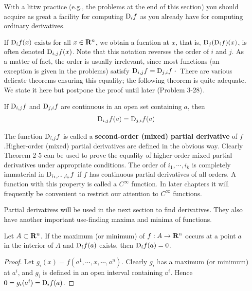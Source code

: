 With a littw practice (e.g., the problems at the end of this
section) you should acquire as great a facility for computing
$\mathrm{D}_if$ as you already have for computing ordinary derivatives.

If $\mathrm{D}_if(x)$ exists for all $x\in \mathbf{R}^n$, we obtain a fucntion at $x$, that 
is, $\mathrm{D}_j(\mathrm{D}_if)(x)$, is often denoted $\mathrm{D}_{i,j}f(x)$. Note that this notation 
reverses the order of $i$ and $j$. As a matter of fact, the
order is usually irrelevant, since most functions (an exception is
given in the problems) satisfy $\mathrm{D}_{i,j}f = \mathrm{D}_{j,i}f$· There are various
delicate theorems ensuring this equality; the following theorem
is quite adequate. We state it here but postpone the proof until later (Problem 3-28).

\begin{theorem}
    If $\mathrm{D}_{i,j}f$ and $\mathrm{D}_{j,i}f$ are continuous in an open set containing $a$, then 
    \begin{align}
        \mathrm{D}_{i,j}f(a) = \mathrm{D}_{j,i}f(a)
    \end{align}
\end{theorem}

The function $\mathrm{D}_{i,j}f$ is called a \textbf{second-order (mixed) partial derivative}
of $f$.Higher-order (mixed) partial derivatives are defined in the obvious way.
Clearly Theorem 2-5 can be used to prove the equality of higher-order mixed
partial derivatives under appropriate conditions.
The order of $i_1, \cdots ,i_k$ is completely immaterial in $\mathrm{D}_{i_1,\cdots,i_k}f$
if $f$ has continuous partial derivatives of all orders. A function
with this property is called a $C^\infty$ function. In later chapters
it will frequently be convenient to restrict our attention to $C^\infty$
functions.

Partial derivatives will be used in the next section to find
derivatives. They also have another important use-finding
maxima and minima of functions.

\begin{theorem}
    Let $A\subset \mathbf{R}^n$. If the maximum (or minimum) of $f:A\to \mathbf{R}^n$ occurs at a 
    point $a$ in the interior of $A$ and $\mathrm{D}_if(a)$ exists, then $\mathrm{D}_if(a) = 0$.
\end{theorem}

\begin{proof}
    Let $g_i(x) = f(a^1, \cdots, x, \cdots, a^n)$. Clearly $g_i$ has a maximum (or minimum)
    at $a^i$, and $g_i$ is defined in an open interval containing 
    $a^i$. Hence $0 = g_i(a^i) = \mathrm{D}_if(a)$.
\end{proof}

